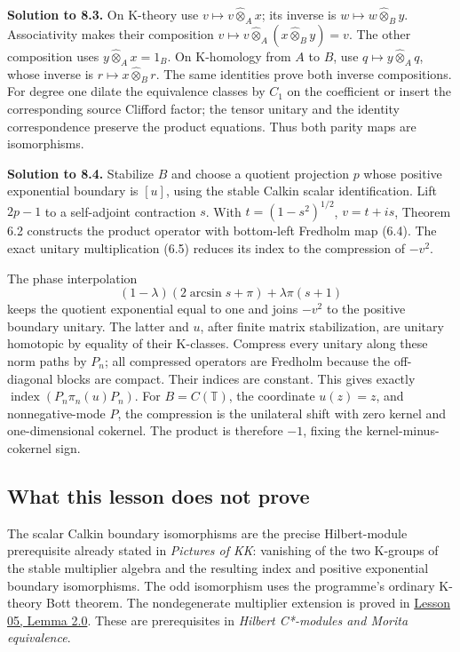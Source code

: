 \documentclass[
  11pt,
]{article}
\begin{document}
\textbf{Solution to 8.3.} On K-theory use
\(v\mapsto v\widehat\otimes_A x\); its inverse is
\(w\mapsto w\widehat\otimes_B y\). Associativity makes their composition
\(v\mapsto v\widehat\otimes_A(x\widehat\otimes_B y)=v\). The other
composition uses \(y\widehat\otimes_A x=1_B\). On K-homology from \(A\)
to \(B\), use \(q\mapsto y\widehat\otimes_A q\), whose inverse is
\(r\mapsto x\widehat\otimes_B r\). The same identities prove both
inverse compositions. For degree one dilate the equivalence classes by
\(C_1\) on the coefficient or insert the corresponding source Clifford
factor; the tensor unitary and the identity correspondence preserve the
product equations. Thus both parity maps are isomorphisms.

\textbf{Solution to 8.4.} Stabilize \(B\) and choose a quotient
projection \(p\) whose positive exponential boundary is \([u]\), using
the stable Calkin scalar identification. Lift \(2p-1\) to a self-adjoint
contraction \(s\). With \(t=(1-s^2)^{1/2}\), \(v=t+is\), Theorem 6.2
constructs the product operator with bottom-left Fredholm map (6.4). The
exact unitary multiplication (6.5) reduces its index to the compression
of \(-v^2\).

The phase interpolation \[
(1-\lambda)(2\arcsin s+\pi)+\lambda\pi(s+1)
\] keeps the quotient exponential equal to one and joins \(-v^2\) to the
positive boundary unitary. The latter and \(u\), after finite matrix
stabilization, are unitary homotopic by equality of their K-classes.
Compress every unitary along these norm paths by \(P_n\); all compressed
operators are Fredholm because the off-diagonal blocks are compact.
Their indices are constant. This gives exactly
\(\operatorname{index}(P_n\pi_n(u)P_n)\). For \(B=C(\mathbb T)\), the
coordinate \(u(z)=z\), and nonnegative-mode \(P\), the compression is
the unilateral shift with zero kernel and one-dimensional cokernel. The
product is therefore \(-1\), fixing the kernel-minus-cokernel sign.

\subsection{What this lesson does not
prove}\label{what-this-lesson-does-not-prove}

The scalar Calkin boundary isomorphisms are the precise Hilbert-module
prerequisite already stated in \emph{Pictures of KK}: vanishing of the
two K-groups of the stable multiplier algebra and the resulting index
and positive exponential boundary isomorphisms. The odd isomorphism uses
the programme's ordinary K-theory Bott theorem. The nondegenerate
multiplier extension is proved in
\href{KT-KK-05.html\#lemma-2-0-compact-module-operators-and-their-multipliers}{Lesson
05, Lemma 2.0}. These are prerequisites in \emph{Hilbert C*-modules and
Morita equivalence}.
\end{document}
